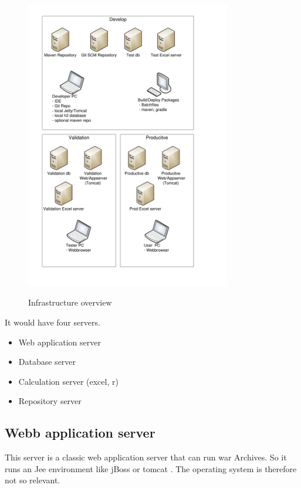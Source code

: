 \documentclass[paper=a4,twoside=false,BCOR=0mm,DIV=calc,fontsize=12pt]{scrartcl}
\begin{document}
\begin{figure}
    \begin{center}
       \includegraphics[width=0.8\textwidth]{./img/InfrastructureLayout.pdf}\\
    \end{center}
  \caption{Infrastructure overview}
  \label{infrastructureoverview}
\end{figure} 

It would have four servers. 
\begin{itemize}
 \item Web application server
 \item Database server
 \item Calculation server (excel, r)
 \item Repository server
\end{itemize}

\subsection{Webb application server}
This server is a classic web application server that can run war Archives. 
So it runs an Jee environment like jBoss \cite{jboss} or tomcat \cite{tomcat}.
The operating system is therefore not so relevant. 
\end{document}
